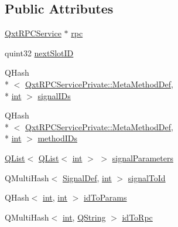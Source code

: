 \subsection*{Public Attributes}
\begin{DoxyCompactItemize}
\item 
\hyperlink{class_qxt_r_p_c_service}{Qxt\-R\-P\-C\-Service} $\ast$ \hyperlink{class_qxt_r_p_c_service_introspector_a6d63e9ebaf93049030c0f002cbb4b801}{rpc}
\item 
quint32 \hyperlink{class_qxt_r_p_c_service_introspector_aa44ab8688af8058365bc75876c78fb22}{next\-Slot\-I\-D}
\item 
Q\-Hash\\*
$<$ \hyperlink{class_qxt_r_p_c_service_private_a307b87cfecad046cb6bc59a6141251ac}{Qxt\-R\-P\-C\-Service\-Private\-::\-Meta\-Method\-Def}, \\*
\hyperlink{ioapi_8h_a787fa3cf048117ba7123753c1e74fcd6}{int} $>$ \hyperlink{class_qxt_r_p_c_service_introspector_a74dedda40d244dab91af357016ea3ec8}{signal\-I\-Ds}
\item 
Q\-Hash\\*
$<$ \hyperlink{class_qxt_r_p_c_service_private_a307b87cfecad046cb6bc59a6141251ac}{Qxt\-R\-P\-C\-Service\-Private\-::\-Meta\-Method\-Def}, \\*
\hyperlink{ioapi_8h_a787fa3cf048117ba7123753c1e74fcd6}{int} $>$ \hyperlink{class_qxt_r_p_c_service_introspector_a5731d54f234700595b57a94949f50ba8}{method\-I\-Ds}
\item 
\hyperlink{class_q_list}{Q\-List}$<$ \hyperlink{class_q_list}{Q\-List}$<$ \hyperlink{ioapi_8h_a787fa3cf048117ba7123753c1e74fcd6}{int} $>$ $>$ \hyperlink{class_qxt_r_p_c_service_introspector_a36a02e28ea7197c8fec17dda6b17da30}{signal\-Parameters}
\item 
Q\-Multi\-Hash$<$ \hyperlink{class_qxt_r_p_c_service_introspector_a78474ec58d5bb0a8cc0b284d60f7548a}{Signal\-Def}, \hyperlink{ioapi_8h_a787fa3cf048117ba7123753c1e74fcd6}{int} $>$ \hyperlink{class_qxt_r_p_c_service_introspector_a92dae8f5cfca0f2427820c7fbc0bb805}{signal\-To\-Id}
\item 
Q\-Hash$<$ \hyperlink{ioapi_8h_a787fa3cf048117ba7123753c1e74fcd6}{int}, \hyperlink{ioapi_8h_a787fa3cf048117ba7123753c1e74fcd6}{int} $>$ \hyperlink{class_qxt_r_p_c_service_introspector_ae03052b8d8b9ef3be689e9e8e205076a}{id\-To\-Params}
\item 
Q\-Multi\-Hash$<$ \hyperlink{ioapi_8h_a787fa3cf048117ba7123753c1e74fcd6}{int}, \hyperlink{group___u_a_v_objects_plugin_gab9d252f49c333c94a72f97ce3105a32d}{Q\-String} $>$ \hyperlink{class_qxt_r_p_c_service_introspector_a20c2fb4e077bf59a4f31ff6804e6cda6}{id\-To\-Rpc}
\end{DoxyCompactItemize}


